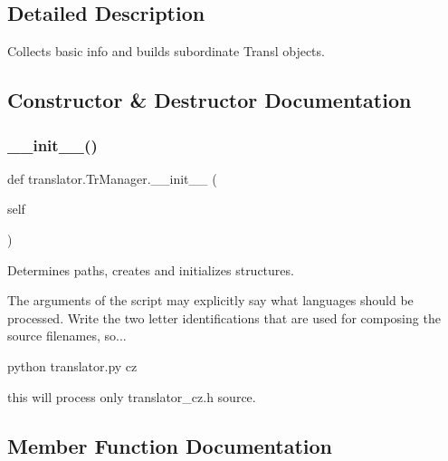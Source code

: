 \subsection{Detailed Description}
\begin{DoxyVerb}Collects basic info and builds subordinate Transl objects.\end{DoxyVerb}
 

\subsection{Constructor \& Destructor Documentation}
\mbox{\label{classtranslator_1_1_tr_manager_af2b5c2c3fa0db925e084b057baf62041}} 
\subsubsection{\texorpdfstring{\_\_init\_\_()}{\_\_init\_\_()}}
{\footnotesize\ttfamily def translator.\+Tr\+Manager.\+\_\+\+\_\+init\+\_\+\+\_\+ (\begin{DoxyParamCaption}\item[{}]{self }\end{DoxyParamCaption})}

\begin{DoxyVerb}Determines paths, creates and initializes structures.

The arguments of the script may explicitly say what languages should
be processed. Write the two letter identifications that are used
for composing the source filenames, so...

    python translator.py cz

this will process only translator_cz.h source.
\end{DoxyVerb}
 

\subsection{Member Function Documentation}
\mbox{\label{classtranslator_1_1_tr_manager_a61f10f267ebea913b1533ad9ad786753}} 
